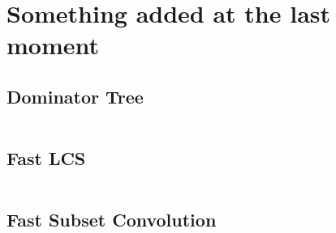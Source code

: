 \section{Something added at the last moment}

\subsection{Dominator Tree}

\inputminted{cpp}{\code/dominator_tree.cpp}

\subsection{Fast LCS}

\inputminted{cpp}{\code/fast_lcs.cpp}

\subsection{Fast Subset Convolution}

\inputminted{cpp}{\code/fast_subset_convolution.cpp}
